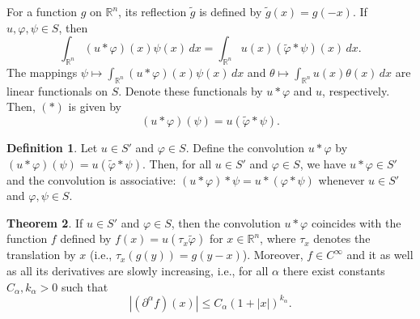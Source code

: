 \documentclass[12pt,openany]{book}
\theoremstyle{definition}
\newtheorem{theorem}{Theorem}[section]
\newtheorem{definition}[theorem]{Definition}
\begin{document}
For a function $g$ on $\mathbb{R}^n$, its reflection $\tilde{g}$ is defined by $\tilde{g}(x) = g(-x)$. If $u, \varphi, \psi \in S$, then
$$
\int_{\mathbb{R}^n} (u * \varphi)(x) \psi(x) \, dx = \int_{\mathbb{R}^n} u(x) (\tilde{\varphi} * \psi)(x) \, dx.
$$
The mappings $\psi \longmapsto \int_{\mathbb{R}^n} (u * \varphi)(x) \psi(x) \, dx$ and $\theta \longmapsto \int_{\mathbb{R}^n} u(x) \theta(x) \, dx$ are linear functionals on $S$. Denote these functionals by $u * \varphi$ and $u$, respectively. Then, $(*)$ is given by
$$
(u * \varphi)(\psi) = u(\tilde{\varphi} * \psi).
$$
\begin{definition}
    Let $u \in S'$ and $\varphi \in S$. Define the convolution $u * \varphi$ by $(u * \varphi)(\psi) = u(\tilde{\varphi} * \psi)$. Then, for all $u \in S'$ and $\varphi \in S$, we have $u * \varphi \in S'$ and the convolution is associative: $(u * \varphi) * \psi = u * (\varphi * \psi)$ whenever $u \in S'$ and $\varphi, \psi \in S$.
\end{definition}
\begin{theorem}
    If $u \in S'$ and $\varphi \in S$, then the convolution $u * \varphi$ coincides with the function $f$ defined by $f(x) = u(\tau_x \tilde{\varphi})$ for $x \in \mathbb{R}^n$, where $\tau_x$ denotes the translation by $x$ (i.e., $\tau_x(g(y)) = g(y-x)$). Moreover, $f \in C^\infty$ and it as well as all its derivatives are slowly increasing, i.e., for all $\alpha$ there exist constants $C_\alpha, k_\alpha > 0$ such that
$$
\left| (\partial^\alpha f)(x) \right| \leqslant C_\alpha (1 + |x|)^{k_\alpha}.
$$
\end{theorem}
\end{document}
